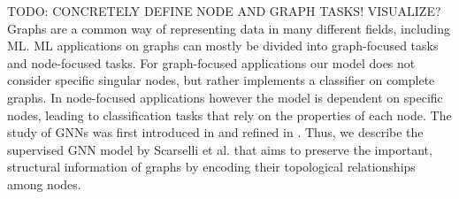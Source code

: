 TODO: CONCRETELY DEFINE NODE AND GRAPH TASKS! VISUALIZE?
Graphs are a common way of representing data in many different fields, including ML. ML applications on graphs can mostly be divided into graph-focused tasks and node-focused tasks. For graph-focused applications our model does not consider specific singular nodes, but rather implements a classifier on complete graphs. In node-focused applications however the model is dependent on specific nodes, leading to classification tasks that rely on the properties of each node.
The study of GNNs was first introduced in \cite{gori2005new} and refined in \cite{4700287}. Thus, we describe the supervised GNN model by Scarselli et al. \cite{4700287} that aims to preserve the important, structural information of graphs by encoding their topological relationships among nodes. 


